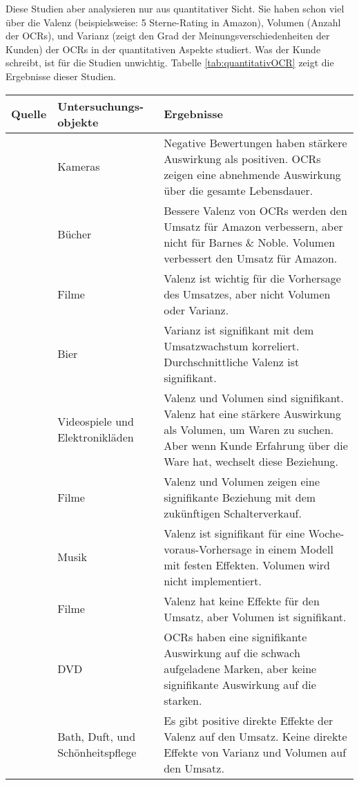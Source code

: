 Diese Studien aber analysieren nur aus quantitativer Sicht. Sie haben schon viel über die Valenz (beispielsweise: 5 Sterne-Rating in Amazon), Volumen (Anzahl der \ac{OCRs}), und Varianz (zeigt den Grad der Meinungsverschiedenheiten der Kunden) der \ac{OCRs} in der quantitativen Aspekte studiert. Was der Kunde schreibt, ist für die Studien unwichtig. Tabelle \ref{tab:quantitativOCR} zeigt die Ergebnisse dieser Studien.


\begin{longtable}{p{} p{}  p{}} 
\hline
Quelle& Untersuchungs-objekte& Ergebnisse\\ \hline
\citet{yubo2011online}& Kameras& Negative Bewertungen haben stärkere Auswirkung als positiven. \ac{OCRs} zeigen eine abnehmende Auswirkung über die gesamte Lebensdauer.\\ \hline
\citet{judith2006the}& Bücher& Bessere Valenz von \ac{OCRs} werden den Umsatz für Amazon verbessern, aber nicht für Barnes \& Noble. Volumen verbessert den Umsatz für Amazon.\\ \hline
\citet{pradeep2010the}& Filme& Valenz ist wichtig für die Vorhersage des Umsatzes, aber nicht Volumen oder Varianz.\\ \hline
\citet{eric2006when}& Bier& Varianz ist signifikant mit dem Umsatzwachstum korreliert. Durchschnittliche Valenz ist signifikant.\\ \hline
\citet{cui2012effect}& Videospiele und Elektronikläden& Valenz und Volumen sind signifikant. Valenz hat eine stärkere Auswirkung als Volumen, um Waren zu suchen. Aber wenn Kunde Erfahrung über die Ware hat, wechselt diese Beziehung.\\ \hline
\citet{Dellarocas200723}& Filme& Valenz und Volumen zeigen eine signifikante Beziehung mit dem zukünftigen Schalterverkauf.\\ \hline
\citet{Dhar2009300}& Musik& Valenz ist signifikant für eine Woche-voraus-Vorhersage in einem Modell mit festen Effekten. Volumen wird nicht implementiert.\\ \hline
\citet{Duan20081007}& Filme& Valenz hat keine Effekte für den Umsatz, aber Volumen ist signifikant.\\ \hline
\citet{nga2013the}& DVD& \ac{OCRs} haben eine signifikante Auswirkung auf die schwach aufgeladene Marken, aber keine signifikante Auswirkung auf die starken.\\ \hline
\citet{wendy2011the}& Bath, Duft, und Schönheitspflege& Es gibt positive direkte Effekte der Valenz auf den Umsatz. Keine direkte Effekte von Varianz und Volumen auf den Umsatz.\\ \hline

\end{longtable}
